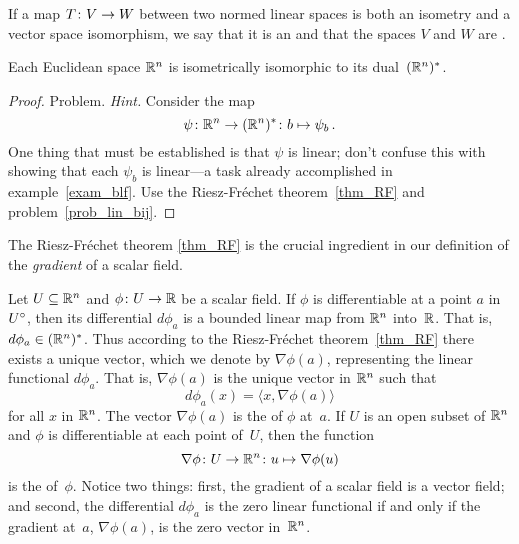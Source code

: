 \begin{defn}  If a map $T \colon V \rightarrow W$ between two normed linear spaces is both an isometry
and a vector space isomorphism, we say that it is an
 and that the spaces $V$ and $W$ are .
\end{defn}

\begin{prop}  Each Euclidean space $\mathbb{R}^n$ is isometrically isomorphic to its dual~$(\mathbb{R}^n)^*$.
\end{prop}

\begin{proof} Problem.   \emph{Hint.}  Consider the map
  \[ \psi\colon \mathbb{R}^n \rightarrow (\mathbb{R}^n)^*\colon b \mapsto \psi_b\,. \]
One thing that must be established is that $\psi$ is linear; don't confuse this with showing
that each $\psi_b$ is linear---a task already accomplished in example~\ref{exam_blf}.  Use the
Riesz-Fr\'echet theorem~\ref{thm_RF} and problem~\ref{prob_lin_bij}.    \ns
\end{proof}

The Riesz-Fr\'echet theorem \ref{thm_RF} is the crucial ingredient in our definition of the
\emph{gradient} of a scalar field.

\begin{defn}  Let $U \subseteq \mathbb{R}^n$ and $\phi\colon U \rightarrow \mathbb{R}$ be a scalar field.  If $\phi$
is differentiable at a point $a$ in $U^{\circ}$, then its differential $d\phi_a$ is a bounded
linear map from $\mathbb{R}^n$ into~$\mathbb{R}$.  That is, $d\phi_a \in (\mathbb{R}^n)^*$.  Thus according to the
Riesz-Fr\'echet theorem~\ref{thm_RF} there exists a unique vector, which we denote by
$\nabla\phi(a)$, representing the linear functional $d\phi_a$.  That is,
$\nabla\phi(a)$ is the unique vector in $\mathbb{R}^n$ such that
  \[ d\phi_a(x)  =  \langle x,\nabla\phi(a) \rangle \]
for all $x$ in $\mathbb{R}^n$.  The vector $\nabla\phi(a)$ is the
 of $\phi$ at~$a$.  If $U$ is an open subset of $\mathbb{R}^n$ and $\phi$ is
differentiable at each point of~$U$, then the function
  \[ \nabla\phi\colon U \rightarrow \mathbb{R}^n\colon u \mapsto \nabla\phi(u) \]
is the
 of~$\phi$.  Notice two things: first, the gradient of a scalar field is a vector
field; and second, the differential $d\phi_a$ is the zero linear functional if and only if the
gradient at~$a$, $\nabla\phi(a)$, is the zero vector in~$\mathbb{R}^n$.
\end{defn}

